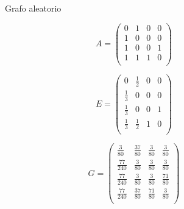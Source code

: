 \documentclass[xetex,mathserif,serif]{beamer}
\begin{document}
\begin{frame}
\begin{figure}[H]
    \centering
    \caption[Grafo aleatorio]{Grafo aleatorio}
    \label{fig:any}
\end{figure}

\begin{equation}
    A =
    \begin{pmatrix}
        0 & 1 & 0 & 0 \\
        1 & 0 & 0 & 0 \\
        1 & 0 & 0 & 1 \\
        1 & 1 & 1 & 0 \\
    \end{pmatrix}
\end{equation}

\begin{equation}
    E =
    \begin{pmatrix}
        0 & \frac{1}{2} & 0 & 0 \\
        \frac{1}{3} & 0 & 0 & 0 \\
        \frac{1}{3} & 0 & 0 & 1 \\
        \frac{1}{3} & \frac{1}{2} & 1 & 0 \\
    \end{pmatrix}
\end{equation}

\begin{equation}
    G =
    \begin{pmatrix}
        \frac{3}{80} & \frac{37}{80} & \frac{3}{80} & \frac{3}{80} \\
        \frac{77}{240} & \frac{3}{80} & \frac{3}{80} & \frac{3}{80} \\
        \frac{77}{240} & \frac{3}{80} & \frac{3}{80} & \frac{71}{80} \\
        \frac{77}{240} & \frac{37}{80} & \frac{71}{80} & \frac{3}{80} \\
    \end{pmatrix}
\end{equation}


\end{frame}
\end{document}

